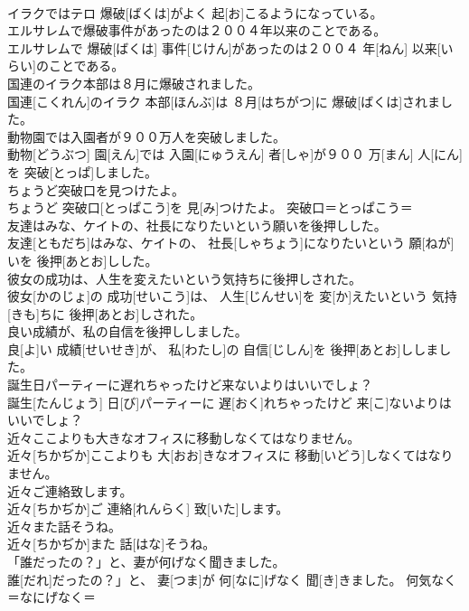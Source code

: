 \documentclass[8pt]{extreport}
\begin{document}
\begin{CJK}{UTF8}{min}
\\	イラクではテロ 爆破[ばくは]がよく 起[お]こるようになっている。	
\\	エルサレムで爆破事件があったのは２００４年以来のことである。	
\\	エルサレムで 爆破[ばくは] 事件[じけん]があったのは２００４ 年[ねん] 以来[いらい]のことである。	
\\	国連のイラク本部は８月に爆破されました。	
\\	国連[こくれん]のイラク 本部[ほんぶ]は ８月[はちがつ]に 爆破[ばくは]されました。	
\\	動物園では入園者が９００万人を突破しました。	
\\	動物[どうぶつ] 園[えん]では 入園[にゅうえん] 者[しゃ]が９００ 万[まん] 人[にん]を 突破[とっぱ]しました。	
\\	ちょうど突破口を見つけたよ。	
\\	ちょうど 突破口[とっぱこう]を 見[み]つけたよ。	突破口＝とっぱこう＝ 
\\	友達はみな、ケイトの、社長になりたいという願いを後押しした。	
\\	友達[ともだち]はみな、ケイトの、 社長[しゃちょう]になりたいという 願[ねが]いを 後押[あとお]しした。	
\\	彼女の成功は、人生を変えたいという気持ちに後押しされた。	
\\	彼女[かのじょ]の 成功[せいこう]は、 人生[じんせい]を 変[か]えたいという 気持[きも]ちに 後押[あとお]しされた。	
\\	良い成績が、私の自信を後押ししました。	
\\	良[よ]い 成績[せいせき]が、 私[わたし]の 自信[じしん]を 後押[あとお]ししました。	
\\	誕生日パーティーに遅れちゃったけど来ないよりはいいでしょ？	
\\	誕生[たんじょう] 日[び]パーティーに 遅[おく]れちゃったけど 来[こ]ないよりはいいでしょ？	
\\	近々ここよりも大きなオフィスに移動しなくてはなりません。	
\\	近々[ちかぢか]ここよりも 大[おお]きなオフィスに 移動[いどう]しなくてはなりません。	
\\	近々ご連絡致します。	
\\	近々[ちかぢか]ご 連絡[れんらく] 致[いた]します。	
\\	近々また話そうね。	
\\	近々[ちかぢか]また 話[はな]そうね。	
\\	「誰だったの？」と、妻が何げなく聞きました。	
\\	誰[だれ]だったの？」と、 妻[つま]が 何[なに]げなく 聞[き]きました。	何気なく＝なにげなく＝ 

\end{CJK}
\end{document}
